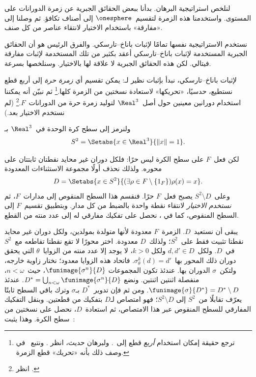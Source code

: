 \documentclass[../../../include/open-logic-section]{subfiles}
\begin{document}
لنلخص استراتيجية البرهان. بدأنا ببعض الحقائق الجبرية عن زمرة
الدورانات على المستوى. واستخدمنا هذه الزمرة لتقسيم~$\onesphere$ إلى
أصناف تكافؤ. ثم وصلنا إلى «مفارقة» باستخدام الاختيار لانتقاء عناصر
من كل صنف.

نستخدم الاستراتيجية نفسها تمامًا لإثبات باناخ--تارسكي. والفرق الرئيس
هو أن الحقائق الجبرية المستخدمة لإثبات باناخ--تارسكي أعقد بكثير من
تلك المستخدمة لإثبات مفارقة فيتالي. لكن هذه الحقائق الجبرية لا علاقة
لها بالاختيار. وسنلخصها بسرعة.

لإثبات باناخ--تارسكي، نبدأ بإثبات نظير لـ: يمكن
تقسيم أي \emph{زمرة حرة} إلى أربع قطع نستطيع، حدسيًا، «تحريكها»
لاستعادة نسختين من الزمرة كلها.\footnote{ترجع حقيقة إمكان استخدام
\emph{أربع} قطع إلى~\cite{Robinson1947}. ولبرهان حديث، انظر
\citet[Theorem 5.2]{Wagon2016}. ونتبع~\citet[p.~3]{Weston2003} في
وصف ذلك بأنه «تحريك» قطع الزمرة.} ثم نبيّن أنه يمكننا استخدام دورانين
معينين حول أصل~$\Real^3$ لتوليد زمرة حرة من الدورانات~$F$.\footnote{انظر
\citet[Theorem 2.1]{Wagon2016}.} (لم نستخدم الاختيار بعد.)

ولنرمز إلى سطح كرة الوحدة في~$\Real^3$ بـ
\[
  S^2 = \Setabs{x\in\Real^3}{\lVert x\rVert=1}.
\]

لكن فعل~$F$ على سطح الكرة ليس حرًا: فلكل دوران غير محايد نقطتان
ثابتتان على محوره. ولذلك نحذف أولًا مجموعة الاستثناءات المعدودة
\[
	D = \Setabs{x \in S^2}{(\exists \rho \in F \setminus \{1_F\})\rho(x)=x}.
\]
وعلى~$S^2 \setminus D$ يصبح فعل~$F$ حرًا. فنقسم هذا السطح
المنقوص إلى مدارات~$F$، ثم \emph{نستخدم الاختيار} لانتقاء نقطة واحدة
بالضبط من كل مدار. وبتطبيق تقسيم~$F$ إلى السطح المنقوص، كما في
، نحصل على تفكيك مفارقي له إلى عدد منته من
القطع.

يبقى أن نستعيد~$D$. الزمرة~$F$ معدودة لأنها متولدة بمولدين، ولكل
دوران غير محايد نقطتا تثبيت فقط على~$S^2$؛ ولذلك~$D$ معدودة. اختر
محورًا لا تقع نقطتا تقاطعه مع~$S^2$ في~$D$. ولكل~$d,d'\in D$ ولكل
$k>0$، لا يوجد إلا عدد منته من الزوايا~$\theta$ التي يحقق دوران ذلك
المحور بها~$\sigma_\theta^k(d)=d'$. فاتحاد هذه الزوايا معدود؛ نختار
زاوية خارجه، ولتكن~$\sigma$ الدوران بها. عندئذ تكون المجموعات
$\funimage{\sigma^n}{D}$، حيث~$n < \omega$، منفصلة اثنتين اثنتين. ونضع
$D^* = \bigcup_{n < \omega}\funimage{\sigma^n}{D}$. عندئذ
$\funimage{\sigma}{D^*} = D^* \setminus D$. ومن ثم فإن تدوير~$D^*$
بـ$\sigma$ وترك باقي السطح ثابتًا يعرّف تقابلًا من~$S^2$ إلى
$S^2 \setminus D$؛ فهو امتصاص لـ$D$ بتفكيك من قطعتين. وبنقل
التفكيك المفارقي للسطح المنقوص عبر هذا الامتصاص، ثم استعادة~$D$،
نحصل على نسختين من سطح الكرة. وهذا يثبت~\citep{Hausdorff1914}:
\end{document}
